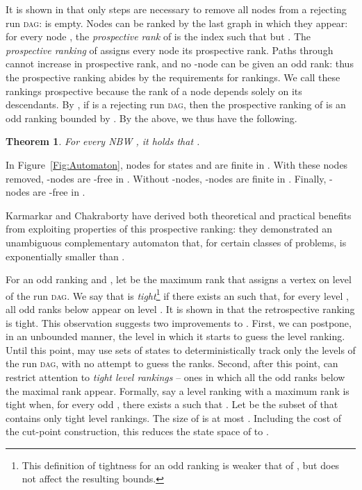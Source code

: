 \documentclass{LMCS}
\newcommand{\DAG}{\textsc{dag}\xspace}
\newcommand{\standout}[1]{\medskip \noindent {\bf #1:}}
\newtheorem{theorem}{Theorem}[section]
\begin{document}
It is shown in \cite{GKSV03,KV01c} that only  steps are necessary to remove all
nodes from a rejecting run \DAG:  is empty. Nodes can be ranked by the last graph in which
they appear: for every node , the \emph{prospective rank} of  is the index  such
that  but .  The \emph{prospective ranking} of  assigns every
node its prospective rank.  Paths through  cannot increase in prospective rank, and no -node
can be given an odd rank: thus the prospective ranking abides by the requirements for rankings. We
call these rankings prospective because the rank of a node depends solely on its descendants.  By
\cite{KV01c}, if  is a rejecting run \DAG, then the prospective ranking of  is an odd
ranking bounded by . By the above, we thus have the following. 

\begin{theorem}\label{KV_Complement}{\rm \cite{KV01c}}
For every NBW , it holds that .
\end{theorem}

\begin{exa}\label{Example2}
In Figure~\ref{Fig:Automaton}, nodes for states  and  are finite in .
With these nodes removed, -nodes are -free in .  Without -nodes, -nodes 
are finite in .  Finally, -nodes are -free in .
\end{exa}


Karmarkar and Chakraborty have derived both theoretical and practical benefits from exploiting properties
of this prospective ranking: they demonstrated an unambiguous complementary automaton that, for
certain classes of problems, is exponentially smaller than  \cite{KC09}.



\standout{Tight Rankings} 
For an odd ranking  and , let  be the maximum rank that  assigns a vertex on level  of the run \DAG.  We say that  is
{\em tight}\footnote{This definition of tightness for an odd ranking is weaker that of
\cite{FKV06}, but does not affect the resulting bounds.} if there exists an  such that, for
every level , all odd ranks below  appear on level .  It is
shown in \cite{FKV06} that the retrospective ranking is tight.  This observation suggests two
improvements to .  First, we can postpone, in an unbounded manner, the level in which it
starts to guess the level ranking. Until this point,  may use sets of states to
deterministically track only the levels of the run \DAG, with no attempt to guess the ranks.
Second, after this point,  can restrict attention to {\em tight level rankings} -- ones in
which all the odd ranks below the maximal rank appear.  Formally, say a level ranking  with a
maximum rank  is tight when, for every odd , there exists a  such that . Let  be the subset of  that
contains only tight level rankings. The size of  is at most  \cite{FKV06}.
Including the cost of the cut-point construction, this reduces the state space of  to
.
\end{document}
